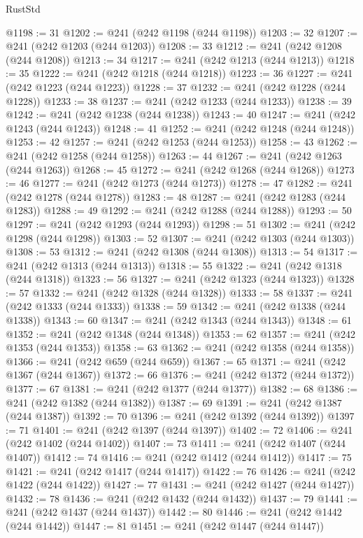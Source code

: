 \begin{lexlean}{RustStd}
\begin{coremodule}
@1198 := 31
@1202 := @241 (@242 @1198 (@244 @1198))
@1203 := 32
@1207 := @241 (@242 @1203 (@244 @1203))
@1208 := 33
@1212 := @241 (@242 @1208 (@244 @1208))
@1213 := 34
@1217 := @241 (@242 @1213 (@244 @1213))
@1218 := 35
@1222 := @241 (@242 @1218 (@244 @1218))
@1223 := 36
@1227 := @241 (@242 @1223 (@244 @1223))
@1228 := 37
@1232 := @241 (@242 @1228 (@244 @1228))
@1233 := 38
@1237 := @241 (@242 @1233 (@244 @1233))
@1238 := 39
@1242 := @241 (@242 @1238 (@244 @1238))
@1243 := 40
@1247 := @241 (@242 @1243 (@244 @1243))
@1248 := 41
@1252 := @241 (@242 @1248 (@244 @1248))
@1253 := 42
@1257 := @241 (@242 @1253 (@244 @1253))
@1258 := 43
@1262 := @241 (@242 @1258 (@244 @1258))
@1263 := 44
@1267 := @241 (@242 @1263 (@244 @1263))
@1268 := 45
@1272 := @241 (@242 @1268 (@244 @1268))
@1273 := 46
@1277 := @241 (@242 @1273 (@244 @1273))
@1278 := 47
@1282 := @241 (@242 @1278 (@244 @1278))
@1283 := 48
@1287 := @241 (@242 @1283 (@244 @1283))
@1288 := 49
@1292 := @241 (@242 @1288 (@244 @1288))
@1293 := 50
@1297 := @241 (@242 @1293 (@244 @1293))
@1298 := 51
@1302 := @241 (@242 @1298 (@244 @1298))
@1303 := 52
@1307 := @241 (@242 @1303 (@244 @1303))
@1308 := 53
@1312 := @241 (@242 @1308 (@244 @1308))
@1313 := 54
@1317 := @241 (@242 @1313 (@244 @1313))
@1318 := 55
@1322 := @241 (@242 @1318 (@244 @1318))
@1323 := 56
@1327 := @241 (@242 @1323 (@244 @1323))
@1328 := 57
@1332 := @241 (@242 @1328 (@244 @1328))
@1333 := 58
@1337 := @241 (@242 @1333 (@244 @1333))
@1338 := 59
@1342 := @241 (@242 @1338 (@244 @1338))
@1343 := 60
@1347 := @241 (@242 @1343 (@244 @1343))
@1348 := 61
@1352 := @241 (@242 @1348 (@244 @1348))
@1353 := 62
@1357 := @241 (@242 @1353 (@244 @1353))
@1358 := 63
@1362 := @241 (@242 @1358 (@244 @1358))
@1366 := @241 (@242 @659 (@244 @659))
@1367 := 65
@1371 := @241 (@242 @1367 (@244 @1367))
@1372 := 66
@1376 := @241 (@242 @1372 (@244 @1372))
@1377 := 67
@1381 := @241 (@242 @1377 (@244 @1377))
@1382 := 68
@1386 := @241 (@242 @1382 (@244 @1382))
@1387 := 69
@1391 := @241 (@242 @1387 (@244 @1387))
@1392 := 70
@1396 := @241 (@242 @1392 (@244 @1392))
@1397 := 71
@1401 := @241 (@242 @1397 (@244 @1397))
@1402 := 72
@1406 := @241 (@242 @1402 (@244 @1402))
@1407 := 73
@1411 := @241 (@242 @1407 (@244 @1407))
@1412 := 74
@1416 := @241 (@242 @1412 (@244 @1412))
@1417 := 75
@1421 := @241 (@242 @1417 (@244 @1417))
@1422 := 76
@1426 := @241 (@242 @1422 (@244 @1422))
@1427 := 77
@1431 := @241 (@242 @1427 (@244 @1427))
@1432 := 78
@1436 := @241 (@242 @1432 (@244 @1432))
@1437 := 79
@1441 := @241 (@242 @1437 (@244 @1437))
@1442 := 80
@1446 := @241 (@242 @1442 (@244 @1442))
@1447 := 81
@1451 := @241 (@242 @1447 (@244 @1447))

\end{coremodule}
\end{lexlean}

